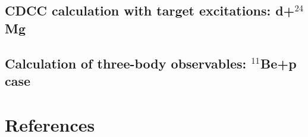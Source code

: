 \documentclass[preprint,12pt]{elsarticle}
\begin{document}
\subsection{CDCC calculation with target excitations: d+$^{24}$Mg }

\subsection{Calculation of three-body observables: $^{11}$Be+p case}



\section{References}
%


\end{document}
